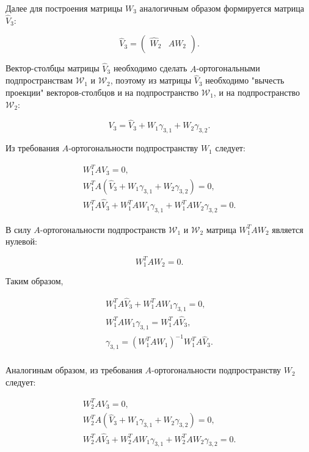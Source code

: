 Далее для построения матрицы $W_3$ аналогичным образом формируется матрица $\widehat{V}_3$:

$$
	\widehat{V}_3 =
		\begin{pmatrix}
		\widehat{W}_2 & A W_2 \\
		\end{pmatrix}
	.
$$

Вектор-столбцы матрицы $\widehat{V}_3$ необходимо сделать $A$-ортогональными подпространствам $\mathcal W_1$ и $\mathcal W_2$,
поэтому из матрицы $\widehat{V}_3$ необходимо "вычесть проекции"{} векторов-столбцов и на подпространство $\mathcal W_1$, и на
подпространство $\mathcal W_2$:

\begin{equation} \label{equation:LM:FS:V_3_orthogonalization}
	V_3 = \widehat{V}_3 + W_1 \gamma_{3,1} + W_2 \gamma_{3,2}.
\end{equation}

Из требования $A$-ортогональности подпространству $W_1$ следует:

$$
	\begin{array}{c}
		W_1^T A V_3 = 0, \\
 		W_1^T A ( \widehat{V}_3 + W_1 \gamma_{3,1} + W_2 \gamma_{3,2} ) = 0, \\
 		W_1^T A \widehat{V}_3 + W_1^T A W_1 \gamma_{3,1} + W_1^T A W_2 \gamma_{3,2} = 0.
	\end{array}
$$

В силу $A$-ортогональности подпространств $\mathcal W_1$ и $\mathcal W_2$ матрица $W_1^T A W_2$ является нулевой:

$$
	W_1^T A W_2 = 0.
$$

Таким образом,

$$
	\begin{array}{c}
 		W_1^T A \widehat{V}_3 + W_1^T A W_1 \gamma_{3,1} = 0, \\
 		W_1^T A W_1 \gamma_{3,1} = W_1^T A \widehat{V}_3, \\
 		\gamma_{3,1} = \left ( W_1^T A W_1 \right ) ^{-1} W_1^T A \widehat{V}_3. \\
	\end{array}
$$

Аналогиным образом, из требования $A$-ортогональности подпространству $W_2$ следует:

$$
	\begin{array}{c}
		W_2^T A V_3 = 0, \\
 		W_2^T A ( \widehat{V}_3 + W_1 \gamma_{3,1} + W_2 \gamma_{3,2} ) = 0, \\
 		W_2^T A \widehat{V}_3 + W_2^T A W_1 \gamma_{3,1} + W_2^T A W_2 \gamma_{3,2} = 0.
	\end{array}
$$

